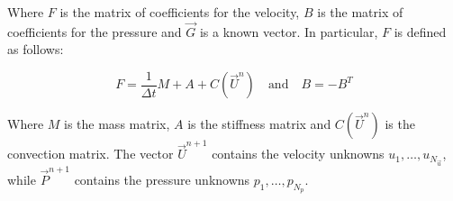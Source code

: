 Where $F$ is the matrix of coefficients for the velocity, $B$ is the matrix of coefficients for the pressure and $\vec{G}$ is a known vector. In particular, $F$ is defined as follows:

\begin{equation}
    F = \frac{1}{\Delta t} M + A + C(\vec{U}^n) \quad \text{and} \quad B = -B^T
\end{equation}

Where $M$ is the mass matrix, $A$ is the stiffness matrix and $C(\vec{U}^n)$ is the convection matrix. The vector $\vec{U}^{n+1}$ contains the velocity unknowns $u_1, \dots, u_{N_{\vec{u}}}$, while $\vec{P}^{n+1}$ contains the pressure unknowns $p_1, \dots, p_{N_p}$.